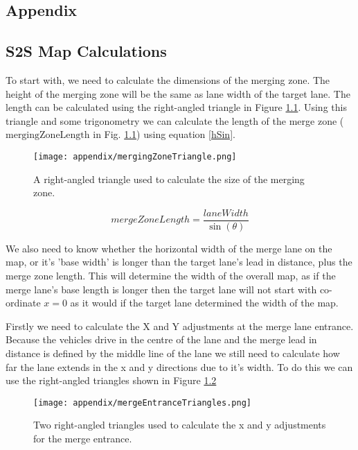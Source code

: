 \begin{appendices}
\chapter{Appendix}
\label{cha:Appendix}

\section{S2S Map Calculations}
\label{sec:S2SMapCalculations}
To start with, we need to calculate the dimensions of the merging zone. The height of the merging zone will be the same as lane width of the target lane. The length can be calculated using the right-angled triangle in Figure \ref{fig:mergingZoneTriangle}. Using this triangle and some trigonometry we can calculate the length of the merge zone ($\text{mergingZoneLength}$ in Fig. \ref{fig:mergingZoneTriangle}) using equation \ref{hSin}.

\begin{figure}[htb]
\texttt{[image: appendix/mergingZoneTriangle.png]}
\caption{A right-angled triangle used to calculate the size of the merging zone.}
\label{fig:mergingZoneTriangle}
\end{figure}

\begin{equation}\label{hSin}
mergeZoneLength = \frac{laneWidth}{\sin(\theta)}
\end{equation}

We also need to know whether the horizontal width of the merge lane on the map, or it's 'base width' is longer than the target lane's lead in distance, plus the merge zone length. This will determine the width of the overall map, as if the merge lane's base length is longer then the target lane will not start with co-ordinate $x=0$ as it would if the target lane determined the width of the map.

Firstly we need to calculate the X and Y adjustments at the merge lane entrance. Because the vehicles drive in the centre of the lane and the merge lead in distance is defined by the middle line of the lane we still need to calculate how far the lane extends in the x and y directions due to it's width. To do this we can use the right-angled triangles shown in Figure \ref{fig:mergeEntranceTriangles}

\begin{figure}[htb]
\texttt{[image: appendix/mergeEntranceTriangles.png]}
\caption{Two right-angled triangles used to calculate the x and y adjustments for the merge entrance.}
\label{fig:mergeEntranceTriangles}
\end{figure}


\end{appendices}
